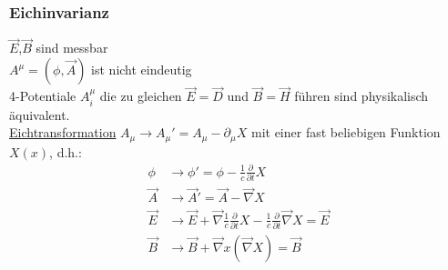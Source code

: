 \documentclass[a4paper]{article}
\begin{document}
\subsubsection{Eichinvarianz}
$\vec{E}$,$\vec{B}$ sind messbar\\
$A^\mu=(\phi,\vec{A})$ ist nicht eindeutig\\
4-Potentiale $A^\mu_i$ die zu gleichen $\vec{E}=\vec{D}$ und $\vec{B}=\vec{H}$
führen sind physikalisch äquivalent.\\
\underline{Eichtransformation} $A_\mu\rightarrow A_\mu'=A_\mu-\partial_\mu X$ mit
einer fast beliebigen Funktion $X(x)$, d.h.:\\
\begin{align}
\phi &\rightarrow \phi'=\phi-\frac{1}{c}\frac{\partial}{\partial t} X\\
\vec{A} &\rightarrow \vec{A}'=\vec{A}-\vec{\nabla}X\\
\vec{E}&\rightarrow\vec{E}+\vec{\nabla}\frac{1}{c}\frac{\partial}{\partial t}
X-\frac{1}{c}\frac{\partial}{\partial t} \vec{\nabla}X=\vec{E}\\
\vec{B}&\rightarrow\vec{B}+\vec{\nabla}x(\vec{\nabla}X)=\vec{B}
\end{align}
\end{document}
